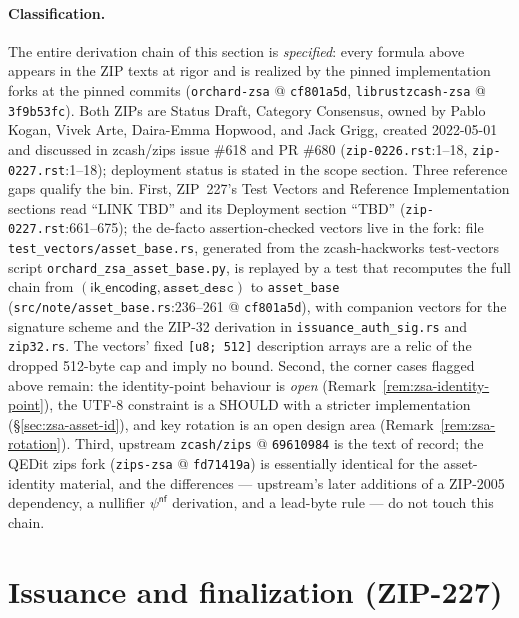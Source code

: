 \documentclass[11pt,a4paper]{article}
\theoremstyle{definition}
\newcommand{\nfsym}{\mathsf{nf}}
\begin{document}
\paragraph{Classification.} The entire derivation chain of this section is
\emph{specified}: every formula above appears in the ZIP texts at rigor
and is realized by the pinned implementation forks at the pinned commits
(\texttt{orchard-zsa} @ \texttt{cf801a5d}, \texttt{librustzcash-zsa} @
\texttt{3f9b53fc}). Both ZIPs are Status Draft, Category Consensus, owned
by Pablo Kogan, Vivek Arte, Daira-Emma Hopwood, and Jack Grigg, created
2022-05-01 and discussed in zcash/zips issue \#618 and PR \#680
(\texttt{zip-0226.rst}:1--18, \texttt{zip-0227.rst}:1--18); deployment
status is stated in the scope section. Three reference gaps qualify the
bin. First, ZIP~227's Test Vectors and Reference Implementation sections
read ``LINK TBD'' and its Deployment section ``TBD''
(\texttt{zip-0227.rst}:661--675); the de-facto assertion-checked vectors
live in the fork: file \texttt{test\_vectors/asset\_base.rs}, generated
from the zcash-hackworks test-vectors script
\texttt{orchard\_zsa\_asset\_base.py}, is replayed by a test that
recomputes the full chain from $(\mathsf{ik\_encoding},
\texttt{asset\_desc})$ to \texttt{asset\_base}
(\texttt{src/note/asset\_base.rs}:236--261 @ \texttt{cf801a5d}), with
companion vectors for the signature scheme and the ZIP-32 derivation in
\texttt{issuance\_auth\_sig.rs} and \texttt{zip32.rs}.
The vectors' fixed \texttt{[u8; 512]} description arrays are a relic of
the dropped 512-byte cap and imply no bound. Second, the corner cases
flagged above remain: the identity-point behaviour is \emph{open}
(Remark~\ref{rem:zsa-identity-point}), the UTF-8 constraint is a SHOULD
with a stricter implementation (\S\ref{sec:zsa-asset-id}), and key
rotation is an open design area (Remark~\ref{rem:zsa-rotation}). Third,
upstream \texttt{zcash/zips} @ \texttt{69610984} is the text of record;
the QEDit zips fork (\texttt{zips-zsa} @ \texttt{fd71419a}) is essentially
identical for the asset-identity material, and the differences ---
upstream's later additions of a ZIP-2005 dependency, a nullifier
$\psi^{\nfsym}$ derivation, and a lead-byte rule --- do not touch this
chain.

\section{Issuance and finalization (ZIP-227)}\label{sec:zsa-issuance}
\end{document}
